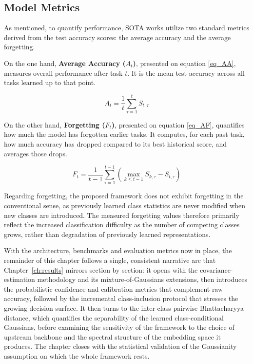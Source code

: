 \subsection{Model Metrics}

As mentioned, to quantify performance, SOTA works \cite{wang2022learning} utilize two standard metrics derived from the test accuracy scores: the average accuracy and the average forgetting.

On the one hand, \textbf{Average Accuracy ($A_t$)}, presented on equation \eqref{eq_AA}, measures overall performance after task $t$. It is the mean test accuracy across all tasks learned up to that point.

\begin{equation}
	A_t = \frac{1}{t} \sum_{\tau=1}^{t} S_{t,\tau}
	\label{eq_AA}
\end{equation}

On the other hand, \textbf{Forgetting ($F_{t}$)}, presented on equation \eqref{eq_AF}, quantifies how much the model has forgotten earlier tasks. It computes, for each past task, how much accuracy has dropped compared to its best historical score, and averages those drops.

\begin{equation}
	F_t = \frac{1}{t-1} \sum_{\tau=1}^{t-1} \left( \max_{k \le t-1} S_{k,\tau} - S_{t,\tau} \right)
	\label{eq_AF}
\end{equation}

Regarding forgetting, the proposed framework does not exhibit forgetting in the conventional sense, as previously learned class statistics are never modified when new classes are introduced. The measured forgetting values therefore primarily reflect the increased classification difficulty as the number of competing classes grows, rather than degradation of previously learned representations.

With the architecture, benchmarks and evaluation metrics now in place, the remainder of this chapter follows a single, consistent narrative arc that Chapter~\ref{ch:results} mirrors section by section: it opens with the covariance-estimation methodology and its mixture-of-Gaussians extensions, then introduces the probabilistic confidence and calibration metrics that complement raw accuracy, followed by the incremental class-inclusion protocol that stresses the growing decision surface. It then turns to the inter-class pairwise Bhattacharyya distance, which quantifies the separability of the learned class-conditional Gaussians, before examining the sensitivity of the framework to the choice of upstream backbone and the spectral structure of the embedding space it produces. The chapter closes with the statistical validation of the Gaussianity assumption on which the whole framework rests.

